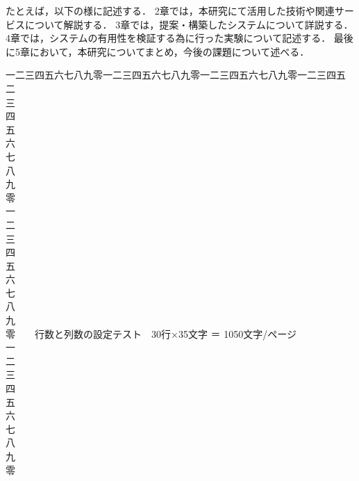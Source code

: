 \documentclass[a4paper,11pt,oneside,openany]{jsbook}
\begin{document}
たとえば，以下の様に記述する．
2章では，本研究にて活用した技術や関連サービスについて解説する．
3章では，提案・構築したシステムについて詳説する．
4章では，システムの有用性を検証する為に行った実験について記述する．
最後に5章において，本研究についてまとめ，今後の課題について述べる．


\newpage
\noindent
一二三四五六七八九零一二三四五六七八九零一二三四五六七八九零一二三四五\\
二\\
三\\
四\\
五\\
六\\
七\\
八\\
九\\
零\\
一\\
二\\
三\\
四\\
五\\
六\\
七\\
八\\
九\\
零　　行数と列数の設定テスト　30行×35文字 ＝ 1050文字/ページ\\
一\\
二\\
三\\
四\\
五\\
六\\
七\\
八\\
九\\
零

%
\end{document}
